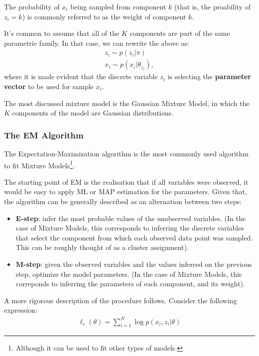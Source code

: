 The probability of $x_i$ being sampled from component $k$ (that is, the proability
of $z_i = k$) is commonly referred to as the weight of component $k$.

It's common to assume that all of the $K$ components are part of the same
parametric family. In that case, we can rewrite the above as:
\begin{align}
    z_i \sim p(z_i | \pi) \\
    x_i \sim p(x_i | \theta_{z_i}),
\end{align} where it is made evident that the discrete variable $z_i$ is selecting
the \textbf{parameter vector} to be used for sample $x_i$.

The most discussed mixture model is the Gaussian Mixture Model, in which the $K$
components of the model are Gaussian distributions.

\subsubsection{The EM Algorithm}
The Expectation-Maximization algorithm is the most commonly used algorithm to
fit Mixture Models\footnote{Although it can be used to fit other types of models.}.

The starting point of EM is the realisation that if all variables were observed,
it would be easy to apply ML or MAP estimation for the parameters. Given that,
the algorithm can be generally described as an alternation between two steps:
\begin{itemize}
    \item \textbf{E-step}: infer the most probable values of the unobserved variables.
        (In the case of Mixture Models, this corresponds to inferring the discrete
        variables that select the component from which each observed data point
        was sampled. This can be roughly thought of as a cluster assignment).
    \item \textbf{M-step}: given the observed variables and the values inferred
        on the previous step, optimize the model parameters. (In the case of 
        Mixture Models, this correponds to inferring the parameters of each
        component, and its weight).
\end{itemize}

A more rigorous description of the procedure follows. Consider the following
expression:
\begin{align}
    \ell_c(\theta) = \sum^N_{i=1} \log p(x_i, z_i | \theta)
\end{align}

